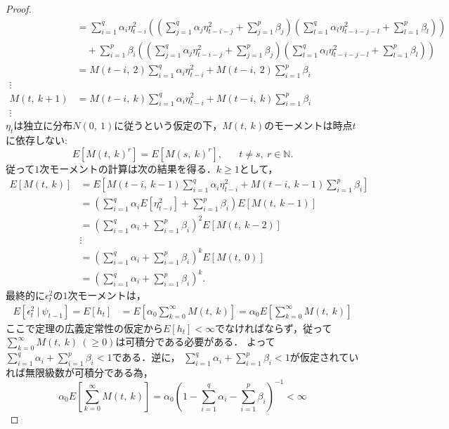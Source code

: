 \documentclass[8pt]{jsarticle}
\newtheorem{proof}{証明}
\begin{document}
\begin{proof}
\begin{align*}
		&= \sum_{i=1}^{q} \alpha_i \eta_{t-i}^2 \left( \left( \sum_{j=1}^{q} \alpha_j \eta_{t-i-j}^2 + \sum_{j=1}^{p} \beta_j \right) \left( \sum_{l=1}^{q} \alpha_l \eta_{t-i-j-l}^2 + \sum_{l=1}^{p} \beta_l \right) \right) \\
			&\quad+ \sum_{i=1}^{p} \beta_i \left( \left( \sum_{j=1}^{q} \alpha_j \eta_{t-i-j}^2 + \sum_{j=1}^{p} \beta_j \right) \left( \sum_{l=1}^{q} \alpha_l \eta_{t-i-j-l}^2 + \sum_{l=1}^{p} \beta_l \right) \right) \\
		&= M(t-i,\ 2) \sum_{i=1}^{q} \alpha_i \eta_{t-i}^2 + M(t-i,\ 2) \sum_{i=1}^{p} \beta_i \\
	\vdots \\
	M(t,\ k+1) &= M(t-i,\ k) \sum_{i=1}^{q} \alpha_i \eta_{t-i}^2 + M(t-i,\ k) \sum_{i=1}^{p} \beta_i \\
	\vdots	
\end{align*}
$\eta_t$は独立に分布$N(0,\ 1)$に従うという仮定の下，$M(t,\ k)$のモーメントは時点$t$に依存しない:
\[
	E[M(t,\ k)^r] = E[M(s,\ k)^r], \hspace{20pt} t \neq s,\ r \in \mathbb{N}.
\]
従って$1$次モーメントの計算は次の結果を得る．$k \geq 1$として，
\begin{align*}
	E[M(t,\ k)] &= E\left[ M(t-i,\ k-1) \sum_{i=1}^{q} \alpha_i \eta_{t-i}^2 + M(t-i,\ k-1) \sum_{i=1}^{p} \beta_i \right] \\
	&= \left( \sum_{i=1}^{q} \alpha_i E[\eta_{t-i}^2] + \sum_{i=1}^{p} \beta_i \right) E[M(t,\ k-1)] \\
	&= \left( \sum_{i=1}^{q} \alpha_i + \sum_{i=1}^{p} \beta_i \right)^2 E[M(t,\ k-2)] \\
	&\vdots \\
	&= \left( \sum_{i=1}^{q} \alpha_i + \sum_{i=1}^{p} \beta_i \right)^k E[M(t,\ 0)] \\
	&= \left( \sum_{i=1}^{q} \alpha_i + \sum_{i=1}^{p} \beta_i \right)^k.
\end{align*}
最終的に$\epsilon_t^2$の$1$次モーメントは，
\begin{align*}
	E[\epsilon_t^2\ |\ \psi_{t-1}] = E[h_t] &= E\left[ \alpha_0 \sum_{k=0}^{\infty} M(t,\ k) \right] 
	= \alpha_0 E\left[ \sum_{k=0}^{\infty} M(t,\ k) \right]
\end{align*}
ここで定理の広義定常性の仮定から$E[h_t] < \infty$でなければならず，従って$\sum_{k=0}^{\infty} M(t,\ k)\ (\geq 0)$は可積分である必要がある．
よって$\sum_{i=1}^{q} \alpha_i + \sum_{i=1}^{p} \beta_i < 1$である．逆に，
$\sum_{i=1}^{q} \alpha_i + \sum_{i=1}^{p} \beta_i < 1$が仮定されていれば無限級数が可積分である為，
\[
	\alpha_0 E\left[ \sum_{k=0}^{\infty} M(t,\ k) \right] = \alpha_0 \left( 1 - \sum_{i=1}^{q} \alpha_i - \sum_{i=1}^{p} \beta_i \right)^{-1} < \infty
\]
\end{proof}
\end{document}
